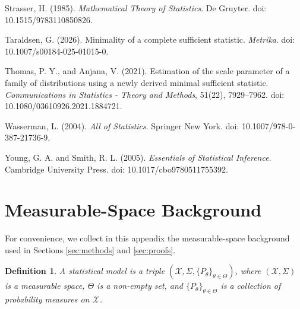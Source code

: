 \documentclass[12pt]{article}
\newtheorem{definition}{Definition}[section]
\begin{document}
\begin{thebibliography}{}
Strasser, H. (1985).
\newblock \emph{Mathematical Theory of Statistics}.
\newblock De Gruyter. doi: 10.1515/9783110850826.

Taraldsen, G. (2026).
\newblock Minimality of a complete sufficient statistic.
\newblock \emph{Metrika}. doi: 10.1007/s00184-025-01015-0.

Thomas, P. Y., and Anjana, V. (2021).
\newblock Estimation of the scale parameter of a family of distributions using a newly derived minimal sufficient statistic.
\newblock \emph{Communications in Statistics - Theory and Methods}, 51(22), 7929--7962. doi: 10.1080/03610926.2021.1884721.

Wasserman, L. (2004).
\newblock \emph{All of Statistics}.
\newblock Springer New York. doi: 10.1007/978-0-387-21736-9.

Young, G. A. and Smith, R. L. (2005).
\newblock \emph{Essentials of Statistical Inference}.
\newblock Cambridge University Press. doi: 10.1017/cbo9780511755392.

\end{thebibliography}

\appendix
\section{Measurable-Space Background}
\label{sec:definitions}

For convenience, we collect in this appendix the measurable-space background used in Sections \ref{sec:methods} and \ref{sec:proofs}.

\begin{definition}\label{def:statistical_model}
A statistical model is a triple $(\mathcal{X},\Sigma,\{P_\theta\}_{\theta\in\Theta })$, where $(\mathcal{X},\Sigma )$ is a measurable space, $\Theta$ is a non-empty set, and $\{P_\theta\}_{\theta\in \Theta}$ is a collection of probability measures on $\mathcal{X}$.
\end{definition}
\end{document}
